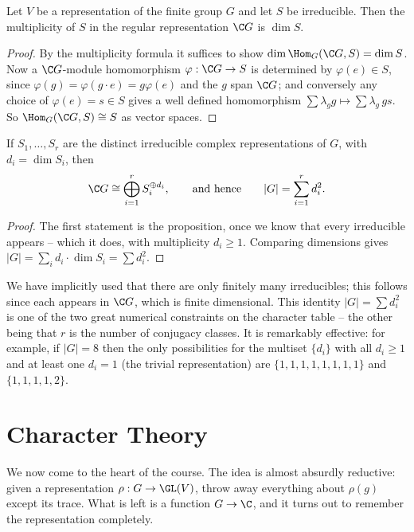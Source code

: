 \begin{proposition}
	Let $V$ be a representation of the finite group $G$ and let $S$ be irreducible. Then the multiplicity of $S$ in the regular representation $\C G$ is $\dim S$.
\end{proposition}
\begin{proof}
	By the multiplicity formula it suffices to show $\dim \Hom_G(\C G, S) = \dim S$. Now a $\C G$-module homomorphism $\varphi : \C G \to S$ is determined by $\varphi(e) \in S$, since $\varphi(g) = \varphi(g \cdot e) = g\varphi(e)$ and the $g$ span $\C G$; and conversely any choice of $\varphi(e) = s \in S$ gives a well defined homomorphism $\sum \lambda_g g \mapsto \sum \lambda_g \, g s$. So $\Hom_G(\C G, S) \cong S$ as vector spaces.
\end{proof}

\begin{corollary}
	If $S_1, \dots, S_r$ are the distinct irreducible complex representations of $G$, with $d_i = \dim S_i$, then
	$$\C G \cong \bigoplus_{i=1}^r S_i^{\oplus d_i}, \qquad \text{and hence} \qquad |G| = \sum_{i=1}^r d_i^2.$$
\end{corollary}
\begin{proof}
	The first statement is the proposition, once we know that every irreducible appears -- which it does, with multiplicity $d_i \geq 1$. Comparing dimensions gives $|G| = \sum_i d_i \cdot \dim S_i = \sum d_i^2$.
\end{proof}

We have implicitly used that there are only finitely many irreducibles; this follows since each appears in $\C G$, which is finite dimensional. This identity $|G| = \sum d_i^2$ is one of the two great numerical constraints on the character table -- the other being that $r$ is the number of conjugacy classes. It is remarkably effective: for example, if $|G| = 8$ then the only possibilities for the multiset $\{d_i\}$ with all $d_i \geq 1$ and at least one $d_i = 1$ (the trivial representation) are $\{1,1,1,1,1,1,1,1\}$ and $\{1,1,1,1,2\}$.

\section{Character Theory}

We now come to the heart of the course. The idea is almost absurdly reductive: given a representation $\rho : G \to \GL(V)$, throw away everything about $\rho(g)$ except its trace. What is left is a function $G \to \C$, and it turns out to remember the representation completely.

